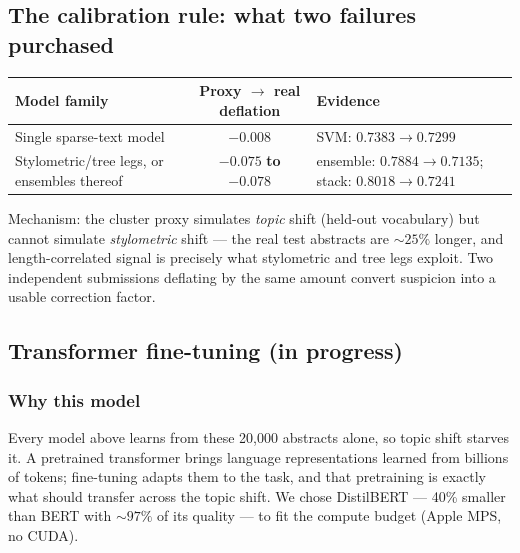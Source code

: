 \documentclass[11pt,a4paper]{article}
\begin{document}
\subsection{The calibration rule: what two failures purchased}\label{sec:calibration}
\begin{center}
\begin{tabular}{lcl}
\toprule
Model family & Proxy $\to$ real deflation & Evidence\\
\midrule
Single sparse-text model & $-0.008$ & SVM: $0.7383 \to 0.7299$\\
Stylometric/tree legs, or ensembles thereof & $\mathbf{-0.075}$ \textbf{to} $\mathbf{-0.078}$ & ensemble: $0.7884 \to 0.7135$; stack: $0.8018 \to 0.7241$\\
\bottomrule
\end{tabular}
\end{center}
Mechanism: the cluster proxy simulates \emph{topic} shift (held-out vocabulary) but cannot simulate \emph{stylometric} shift --- the real test abstracts are ${\sim}25\%$ longer, and length-correlated signal is precisely what stylometric and tree legs exploit. Two independent submissions deflating by the same amount convert suspicion into a usable correction factor.

\subsection{Transformer fine-tuning (in progress)}\label{sec:transformer}

\subsubsection{Why this model}
Every model above learns from these 20{,}000 abstracts alone, so topic shift starves it. A pretrained transformer \cite{vaswani2017, devlin2019} brings language representations learned from billions of tokens; fine-tuning adapts them to the task, and that pretraining is exactly what should transfer across the topic shift. We chose DistilBERT \cite{sanh2019} --- 40\% smaller than BERT with ${\sim}97\%$ of its quality --- to fit the compute budget (Apple MPS, no CUDA).
\end{document}
